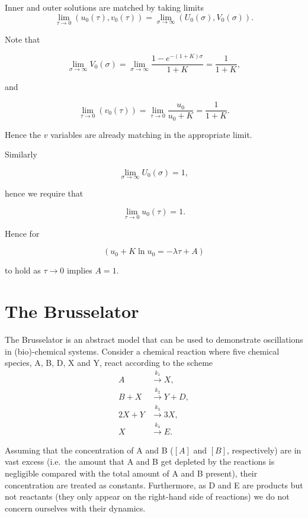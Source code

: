\documentclass[
  letterpaper,
  DIV=11,
  numbers=noendperiod]{scrreprt}
\begin{document}
Inner and outer solutions are matched by taking limits \[
\lim_{\tau \rightarrow 0}(u_0(\tau),v_0(\tau))=\lim_{\sigma \rightarrow \infty}(U_0(\sigma),V_0(\sigma)).
\]

Note that

\[
\lim_{\sigma\rightarrow \infty} V_0(\sigma)= \lim_{\sigma\rightarrow \infty}  \frac{1-e^{-(1+K)\sigma}}{1+K} = \frac{1}{1+K},
\]

and

\[
\lim_{\tau\rightarrow 0}(v_0(\tau)) =\lim_{\tau\rightarrow 0}\frac{u_0}{u_0+K} =  \frac{1}{1+K}. 
\]

Hence the \(v\) variables are already matching in the appropriate limit.

Similarly

\[
\lim_{\sigma\rightarrow \infty} U_0(\sigma)= 1,
\]

hence we require that

\[
\lim_{\tau \rightarrow 0} u_0(\tau)= 1.
\]

Hence for

\[
 (u_0+K\ln u_0=-\lambda \tau +A)
\]

to hold as \(\tau \rightarrow 0\) implies \(A=1\).

\hypertarget{the-brusselator}{%
\section{The Brusselator}\label{the-brusselator}}

The Brusselator is an abstract model that can be used to demonstrate
oscillations in (bio)-chemical systems. Consider a chemical reaction
where five chemical species, A, B, D, X and Y, react according to the
scheme \[
\begin{aligned}
A&\xrightarrow{k_{1}} X,  \nonumber \\
B+X&\xrightarrow{k_{2}} Y+D, \nonumber\\
2X+Y&\xrightarrow{k_{3}} 3X, \nonumber\\
X&\xrightarrow{k_{4}} E. 
\end{aligned}
\]

Assuming that the concentration of A and B (\([A]\) and \([B]\),
respectively) are in vast excess (i.e.~the amount that A and B get
depleted by the reactions is negligible compared with the total amount
of A and B present), their concentration are treated as constants.
Furthermore, as D and E are products but not reactants (they only appear
on the right-hand side of reactions) we do not concern ourselves with
their dynamics.
\end{document}
